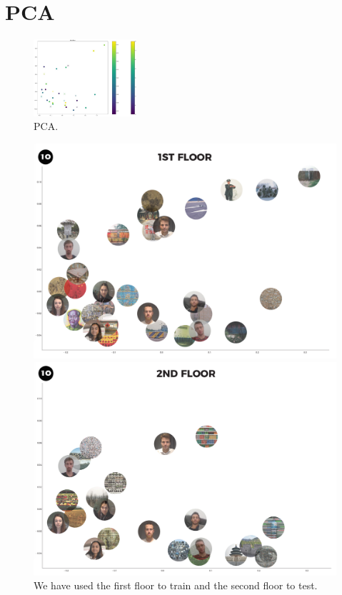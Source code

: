 \documentclass[journal, a4paper]{IEEEtran}
\begin{document}
\section{PCA}
\begin{figure}[h]
    \centering
    \includegraphics[width=3.8cm]{pcaOK.jpg}
    \caption{PCA.}
    \label{fig:pca}
\end{figure}


\begin{figure}[!h]
  \centering
  \begin{minipage}[b]{0.24\textwidth}
    \includegraphics[width=\textwidth]{trainpca.png}
  \end{minipage}
  \hfill
  \begin{minipage}[b]{0.24\textwidth}
    \includegraphics[width=\textwidth]{testpca.png}
  \end{minipage}
  \caption{We have used the first floor to train and the second floor to test.}
  \label{fig:pca-art}
\end{figure}
\end{document}
